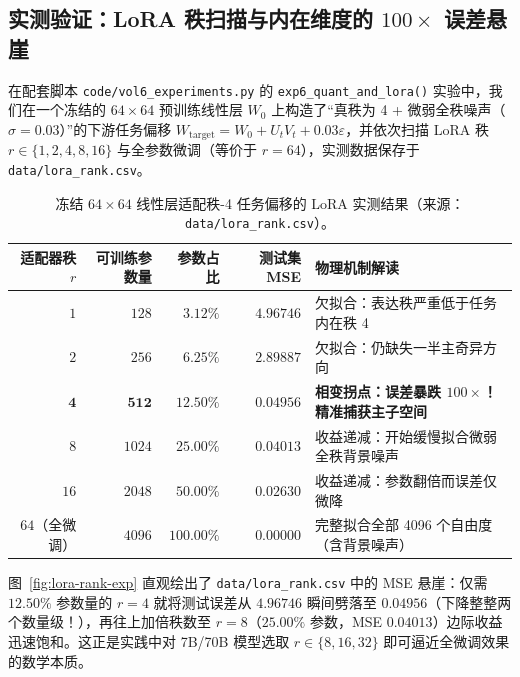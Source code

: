 \subsection{实测验证：LoRA 秩扫描与内在维度的 $100\times$ 误差悬崖}

在配套脚本 \texttt{code/vol6\_experiments.py} 的 \texttt{exp6\_quant\_and\_lora()} 实验中，我们在一个冻结的 $64\times 64$ 预训练线性层 $W_0$ 上构造了“真秩为 4 + 微弱全秩噪声（$\sigma = 0.03$）”的下游任务偏移 $W_{\mathrm{target}} = W_0 + U_t V_t + 0.03\varepsilon$，并依次扫描 LoRA 秩 $r \in \{1, 2, 4, 8, 16\}$ 与全参数微调（等价于 $r = 64$），实测数据保存于 \texttt{data/lora\_rank.csv}。

\begin{table}[htbp]
\centering
\caption{冻结 $64\times 64$ 线性层适配秩-4 任务偏移的 LoRA 实测结果（来源：\texttt{data/lora\_rank.csv}）。}
\label{tab:lora-rank}
\small
\begin{tabular}{@{}rrrrl@{}}
\toprule
\textbf{适配器秩 $r$} & \textbf{可训练参数量} & \textbf{参数占比} & \textbf{测试集 MSE} & \textbf{物理机制解读} \\
\midrule
$1$ & $128$ & $3.12\%$ & $4.96746$ & 欠拟合：表达秩严重低于任务内在秩 4 \\
$2$ & $256$ & $6.25\%$ & $2.89887$ & 欠拟合：仍缺失一半主奇异方向 \\
$\mathbf{4}$ & $\mathbf{512}$ & $\mathbf{12.50\%}$ & $\mathbf{0.04956}$ & \textbf{相变拐点：误差暴跌 $100\times$！精准捕获主子空间} \\
$8$ & $1024$ & $25.00\%$ & $0.04013$ & 收益递减：开始缓慢拟合微弱全秩背景噪声 \\
$16$ & $2048$ & $50.00\%$ & $0.02630$ & 收益递减：参数翻倍而误差仅微降 \\
$64$（全微调） & $4096$ & $100.00\%$ & $0.00000$ & 完整拟合全部 4096 个自由度（含背景噪声） \\
\bottomrule
\end{tabular}
\end{table}

图~\ref{fig:lora-rank-exp} 直观绘出了 \texttt{data/lora\_rank.csv} 中的 MSE 悬崖：仅需 $12.50\%$ 参数量的 $r = 4$ 就将测试误差从 $4.96746$ 瞬间劈落至 $0.04956$（下降整整两个数量级！），再往上加倍秩数至 $r = 8$（$25.00\%$ 参数，MSE $0.04013$）边际收益迅速饱和。这正是实践中对 7B/70B 模型选取 $r \in \{8, 16, 32\}$ 即可逼近全微调效果的数学本质。


